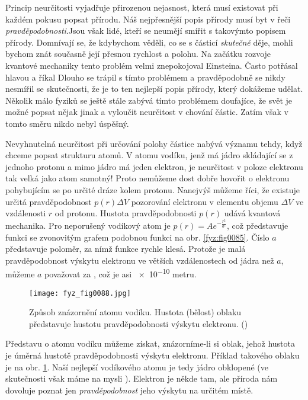     Princip neurčitosti vyjadřuje přirozenou nejasnost, která musí existovat při každém pokusu 
    popsat přírodu. Náš nejpřesnější popis přírody musí byt v řeči \emph{pravděpodobnosti}.Jsou 
    však lidé, kteří se neumějí smířit s takovýmto popisem přírody. Domnívají se, že kdybychom 
    věděli, co se s částicí  \emph{skutečně} děje, mohli bychom znát současně její přesnou rychlost 
    a polohu. Na začátku rozvoje kvantové mechaniky tento problém velmi znepokojoval Einsteina. 
    Často potřásal hlavou a říkal  Dlouho se trápil s tímto problémem a pravděpodobně se nikdy nesmířil se skutečnosti, 
    že je to ten nejlepší popis přírody, který dokážeme udělat. Několik málo fyziků se ještě stále 
    zabývá tímto problémem doufajíce, že svět je možné popsat nějak jinak a vyloučit neurčitost v 
    chování částic. Zatím však v tomto směru nikdo nebyl úspěšný. 
    
    Nevyhnutelná neurčitost při určování polohy částice nabývá významu tehdy, když chceme popsat 
    strukturu atomů. V atomu vodíku, jenž má jádro skládající se z jednoho protonu a mimo jádro má 
    jeden elektron, je neurčitost v poloze elektronu tak velká jako atom samotný! Proto nemůžeme 
    dost dobře hovořit o elektronu pohybujícím se po určité dráze kolem protonu. Nanejvýš můžeme 
    říci, že existuje určitá pravděpodobnost \(p(r)\Delta V\) pozorování elektronu v elementu 
    objemu \(\Delta V\) ve vzdálenosti \(r\) od protonu. Hustota pravděpodobnosti \(p(r)\) udává 
    kvantová mechanika. Pro neporušený vodíkový atom je \(p(r) = Ae^{-\frac{r^2}{a^2}}\), což 
    představuje funkci se zvonovitým grafem podobnou funkci na obr. \ref{fyz:fig0085}. Číslo \(a\) 
    představuje  poloměr, za nímž funkce rychle klesá. Protože je malá 
    pravděpodobnost výskytu elektronu ve větších vzdálenostech od jádra než \(a\), můžeme \(a\) 
    považovat za , což je asi \num{e-10} metru. 

    \begin{figure}[ht!]  %
      \centering
      \texttt{[image: fyz\_fig0088.jpg]}
      \caption{Způsob znázornění atomu vodíku. Hustota (bělost) oblaku představuje hustotu 
               pravděpodobnosti výskytu elektronu. 
               (\cite[s.~90]{Feynman01})}
      \label{fyz:fig0088}
    \end{figure}
    Představu o atomu vodíku můžeme získat, znázorníme-li si oblak, jehož hustota je úměrná hustotě 
    pravděpodobnosti výskytu elektronu. Příklad takového oblaku je na obr. \ref{fyz:fig0088}. Naší 
    nejlepší  vodíkového atomu je tedy jádro obklopené  (ve 
    skutečnosti však máme na mysli ). Elektron je někde tam, ale příroda 
    nám dovoluje poznat jen \emph{pravděpodobnost} jeho výskytu na určitém místě.
    
